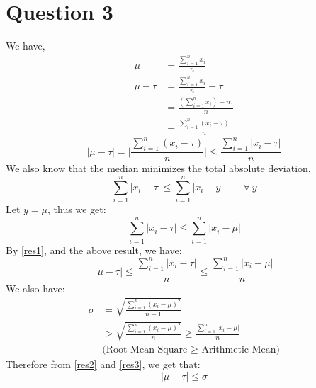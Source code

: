 \documentclass[11pt]{article}
\begin{document}
\section*{Question 3}
\setcounter{equation}{0}
We have,
\begin{equation*}
    \begin{split}
        \mu &= \frac{\sum_{i=1}^n x_i}{n} \\
        \mu - \tau &= \frac{\sum_{i=1}^n x_i}{n} - \tau \\
            &= \frac{(\sum_{i=1}^nx_i) - n\tau}{n} \\
            &= \frac{\sum_{i=1}^n (x_i - \tau)}{n}
    \end{split}
\end{equation*} 
\begin{equation}
    \label{res1}
    |\mu - \tau| = \Bigg|\frac{\sum_{i=1}^n (x_i - \tau)}{n}\Bigg| \le \frac{\sum_{i=1}^n |x_i - \tau|}{n}
\end{equation}
We also know that the median minimizes the total absolute deviation.
\begin{equation*}
    \sum_{i=1}^n |x_i - \tau| \le \sum_{i=1}^n |x_i - y| \hspace{2em} \forall \ y 
\end{equation*}
Let $y = \mu$, thus we get:
\begin{equation*}
    \sum_{i=1}^n |x_i - \tau| \le \sum_{i=1}^n |x_i - \mu|
\end{equation*}     
By \eqref{res1}, and the above result, we have:
\begin{equation}
    \label{res2}
    |\mu - \tau| \le \frac{\sum_{i=1}^n |x_i - \tau|}{n} \le \frac{\sum_{i=1}^n |x_i - \mu|}{n}
\end{equation}
We also have:
\begin{equation}
    \label{res3}
    \begin{split}
        \sigma &= \sqrt{\frac{\sum_{i=1}^n (x_i - \mu)^2}{n-1}} \\
            &> \sqrt{\frac{\sum_{i=1}^n (x_i - \mu)^2}{n}} \ge \frac{\sum_{i=1}^n |x_i - \mu|}{n} \hspace{2em} \\
            &\text{(Root Mean Square $\ge$ Arithmetic Mean)}
    \end{split}
\end{equation}
Therefore from \eqref{res2} and \eqref{res3}, we get that:
\begin{equation*}
    |\mu - \tau| \le \sigma
\end{equation*}
\hfill \qedsymbol \\
\end{document}
